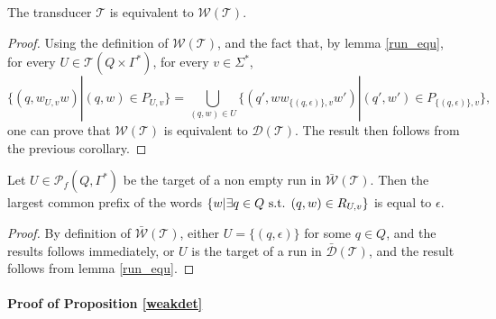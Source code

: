 \documentclass[envcountsame]{llncs}
\newcommand\tra{\mathcal{T}}
\begin{document}
\begin{corollary}\label{wdet_equ}
The transducer $\tra$ is equivalent to $\mathcal{W}(\tra)$.
\end{corollary}

\begin{proof}
Using the definition of $\mathcal{W}(\tra)$, and the fact that, by lemma \ref{run_equ}, for every $U \in \mathcal{T}(Q \times \Gamma^*)$, for every $v \in \Sigma^*$,
$$\{ (q,w_{U,v}w) | (q,w) \in P_{U,v} \} = \bigcup_{(q,w) \in U} \{ (q',ww_{\{ (q,\epsilon)\},v}w') | (q',w') \in P_{\{ (q,\epsilon)\},v} \},$$
one can prove that $\mathcal{W}(\tra)$ is equivalent to $\mathcal{D}(\tra)$.
The result then follows from the previous corollary.
\end{proof}

\begin{corollary}\label{pref_empt}
Let $U \in \mathcal{P}_f(Q, \Gamma^*)$ be the target of a non empty run in $\bar{\mathcal{W}}(\tra)$.
Then the largest common prefix of the words $\{ w | \exists q \in Q \textup{ s.t. } (q,w) \in R_{U,v} \}$ is equal to $\epsilon$.
\end{corollary}

\begin{proof}
By definition of $\bar{\mathcal{W}}(\tra)$, either $U = \{(q,\epsilon)\}$ for some $q \in Q$, and the results follows immediately, or $U$ is the target of a run in $\bar{\mathcal{D}}(\tra)$, and the result follows from lemma \ref{run_equ}.
\end{proof}

\paragraph{Proof of Proposition \ref{weakdet}}
\end{document}
